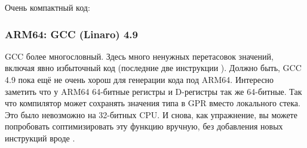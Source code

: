 Очень компактный код:



\subsubsection{ARM64: \NonOptimizing GCC (Linaro) 4.9}



\NonOptimizing GCC более многословный.
Здесь много ненужных перетасовок значений, включая явно избыточный код 
(последние две инструкции ).
Должно быть, GCC 4.9 пока ещё не очень хорош для генерации кода под ARM64.
Интересно заметить что у ARM64 64-битные регистры и D-регистры так же 64-битные.
Так что компилятор может сохранять значения типа \Tdouble в \ac{GPR} вместо локального стека.
Это было невозможно на 32-битных CPU.
И снова, как упражнение, вы можете попробовать соптимизировать эту функцию вручную, без добавления
новых инструкций вроде .

